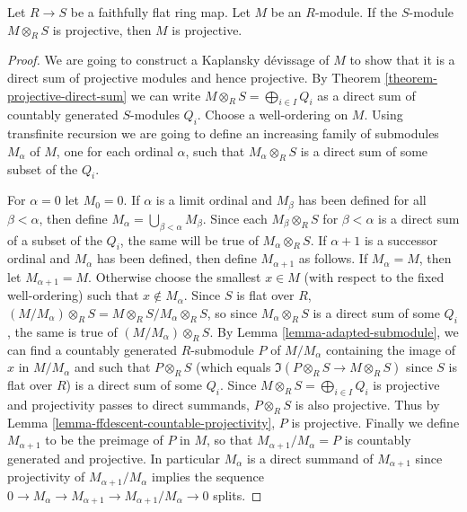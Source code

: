 \begin{theorem}
\label{theorem-ffdescent-projectivity}
Let $R \to S$ be a faithfully flat ring map.  Let $M$ be an $R$-module.
 If the $S$-module $M \otimes_R S$ is projective, then $M$ is projective.
\end{theorem}

\begin{proof}
We are going to construct a Kaplansky d\'evissage of $M$ to show that it is a
direct sum of projective modules and hence projective.  By Theorem
\ref{theorem-projective-direct-sum} we can write $M \otimes_R S =
\bigoplus_{i \in I} Q_i$ as a direct sum of countably generated $S$-modules
$Q_i$.  Choose a well-ordering on $M$.  Using transfinite recursion we are going
to define an increasing family of submodules $M_{\alpha}$ of $M$, one for each
ordinal $\alpha$, such that $M_{\alpha} \otimes_R S$ is a direct sum of some
subset of the $Q_i$.

\medskip\noindent
For $\alpha = 0$ let $M_0 = 0$.  If $\alpha$ is a limit ordinal and $M_{\beta}$
has been defined for all $\beta < \alpha$, then define $M_\alpha =
\bigcup_{\beta < \alpha} M_{\beta}$.  Since each $M_{\beta} \otimes_R S$ for
$\beta < \alpha$ is a direct sum of a subset of the $Q_i$, the same will be
true of $M_{\alpha} \otimes_R S$.  If $\alpha + 1$ is a successor ordinal and
$M_{\alpha}$ has been defined, then define $M_{\alpha + 1}$ as follows.  If
$M_{\alpha} = M$, then let $M_{\alpha +1} = M$.  Otherwise choose the smallest
$x \in M$ (with respect to the fixed well-ordering) such that $x \notin
M_{\alpha}$. Since $S$ is flat over $R$, $(M/M_{\alpha}) \otimes_R S = M
\otimes_R S/M_{\alpha} \otimes_R S$, so since $M_{\alpha} \otimes_R S$ is
a direct sum of some $Q_i$, the same is true of $(M/M_{\alpha}) \otimes_R
S$.   By Lemma \ref{lemma-adapted-submodule}, we can find a countably generated
$R$-submodule $P$ of $M/M_{\alpha}$ containing the image of $x$ in
$M/M_{\alpha}$ and such that $P \otimes_R S$ (which equals $\Im(P
\otimes_R S \to M \otimes_R S)$ since $S$ is flat over $R$) is a
direct sum of some $Q_i$. Since $M \otimes_R S = \bigoplus_{i \in I} Q_i$
is projective and projectivity passes to direct summands, $P \otimes_R S$ is
also projective.  Thus by Lemma \ref{lemma-ffdescent-countable-projectivity},
$P$ is projective.  Finally we define $M_{\alpha + 1}$ to be the preimage of $P$
in $M$, so that $M_{\alpha + 1}/M_{\alpha} = P$ is countably generated and
projective.  In particular $M_{\alpha}$ is a direct summand of $M_{\alpha + 1}$
since projectivity of $M_{\alpha + 1}/M_{\alpha}$ implies the sequence $0
\to M_{\alpha} \to M_{\alpha + 1} \to
M_{\alpha + 1}/M_{\alpha} \to 0$ splits.


\end{proof}
